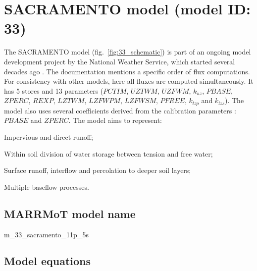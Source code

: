 \section{SACRAMENTO model (model ID: 33)}
The SACRAMENTO model (fig.~\ref{fig:33_schematic}) is part of an ongoing model development project by the National Weather Service, which started several decades ago \citep{Burnash1995,NationalWeatherService2005}. The documentation mentions a specific order of flux computations. For consistency with other models, here all fluxes are computed simultaneously. It has 5 stores and 13 parameters ($PCTIM$, $UZTWM$, $UZFWM$, $k_{uz}$, $PBASE$, $ZPERC$, $REXP$, $LZTWM$, $LZFWPM$, $LZFWSM$, $PFREE$, $k_{lzp}$ and $k_{lzs}$). The model also uses several coefficients derived from the calibration parameters \citep{Koren2000}: $PBASE$ and $ZPERC$. The model aims to represent:

\begin{itemizecompact}
\item Impervious and direct runoff;
\item Within soil division of water storage between tension and free water;
\item Surface runoff, interflow and percolation to deeper soil layers;
\item Multiple baseflow processes.
\end{itemizecompact}

\subsection{MARRMoT model name}
m\_33\_sacramento\_11p\_5s \\

\subsection{Model equations}

